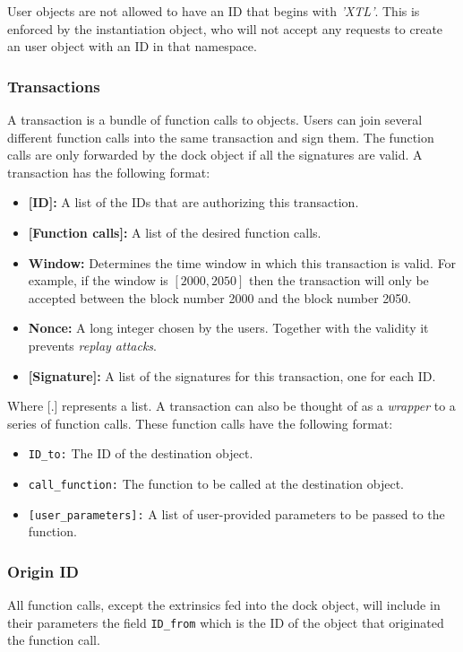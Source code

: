 \documentclass[conference]{IEEEtran}
\begin{document}
User objects are not allowed to have an ID that begins with \textit{'XTL'}. This is enforced by the instantiation object, who will not accept any requests to create an user object with an ID in that namespace.

\subsubsection{Transactions}
A transaction is a bundle of function calls to objects. Users can join several different function calls into the same transaction and sign them. The function calls are only forwarded by the dock object if all the signatures are valid. A transaction has the following format:

\begin{itemize}
	\item \textbf{[ID]:} A list of the IDs that are authorizing this transaction.
	\item \textbf{[Function calls]:} A list of the desired function calls.
	\item \textbf{Window:} Determines the time window in which this transaction is valid. For example, if the window is $[2000, 2050]$ then the transaction will only be accepted between the block number 2000 and the block number 2050.
	\item \textbf{Nonce:} A long integer chosen by the users. Together with the validity it prevents \textit{replay attacks}.
	\item \textbf{[Signature]:} A list of the signatures for this transaction, one for each ID.
\end{itemize}

Where [.] represents a list. A transaction can also be thought of as a \textit{wrapper} to a series of function calls. These function calls have the following format:

\begin{itemize}
	\item \texttt{ID\_to:} The ID of the destination object.
	\item \texttt{call\_function:} The function to be called at the destination object.
	\item \texttt{[user\_parameters]:} A list of user-provided parameters to be passed to the function.
\end{itemize}

\subsubsection{Origin ID}
All function calls, except the extrinsics fed into the dock object, will include in their parameters the field \texttt{ID\_from} which is the ID of the object that originated the function call.
\end{document}
